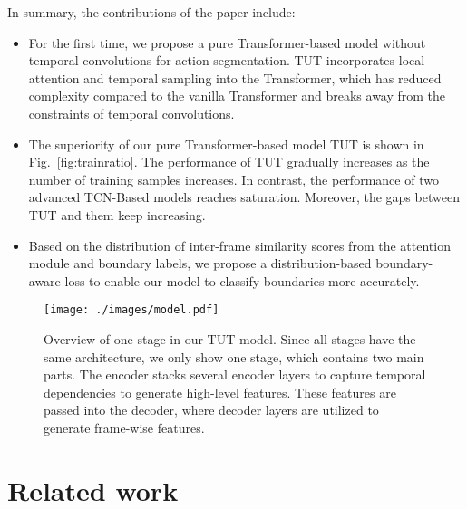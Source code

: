 \documentclass[letterpaper]{article} \usepackage[submission]{aaai23}  \usepackage{times}  \usepackage{helvet}  \usepackage{courier}  \usepackage[hyphens]{url}  \usepackage{graphicx} \urlstyle{rm} \def\UrlFont{\rm}  \usepackage{natbib}  \usepackage{caption} \frenchspacing  \setlength{\pdfpagewidth}{8.5in} \setlength{\pdfpageheight}{11in} \usepackage{algorithm}
\begin{document}
In summary, the contributions of the paper include: 
\begin{itemize}
\item For the first time, we propose a pure Transformer-based model without temporal convolutions for action segmentation. TUT incorporates local attention and temporal sampling into the Transformer, which has reduced complexity compared to the vanilla Transformer and breaks away from the constraints of temporal convolutions.
\item The superiority of our pure Transformer-based model TUT is shown in Fig.~\ref{fig:trainratio}. The performance of TUT gradually increases as the number of training samples increases. In contrast, the performance of two advanced TCN-Based models reaches saturation. Moreover, the gaps between TUT and them keep increasing.
\item Based on the distribution of inter-frame similarity scores from the attention module and boundary labels, we propose a distribution-based boundary-aware loss to enable our model to classify boundaries more accurately.
\end{itemize}

\begin{figure*}[t]
\centering
\texttt{[image: ./images/model.pdf]} \caption{Overview of one stage in our TUT model. Since all stages have the same architecture, we only show one stage, which contains two main parts. The encoder stacks several encoder layers to capture temporal dependencies to generate high-level features. These features are passed into the decoder, where decoder layers are utilized to generate frame-wise features.}
\label{fig:model}
\end{figure*}

\section{Related work}
\label{sec:relatedwork}
\end{document}
